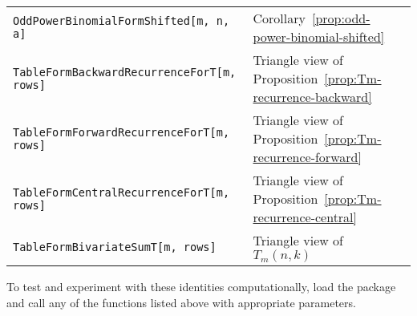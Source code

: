 \begin{center}
\begin{tabular}{ll}
        \texttt{OddPowerBinomialFormShifted[m, n, a]}       & Corollary~\ref{prop:odd-power-binomial-shifted}                    \\
        \texttt{TableFormBackwardRecurrenceForT[m, rows]}   & Triangle view of Proposition~\ref{prop:Tm-recurrence-backward}     \\
        \texttt{TableFormForwardRecurrenceForT[m, rows]}    & Triangle view of Proposition~\ref{prop:Tm-recurrence-forward}      \\
        \texttt{TableFormCentralRecurrenceForT[m, rows]}    & Triangle view of Proposition~\ref{prop:Tm-recurrence-central}      \\
        \texttt{TableFormBivariateSumT[m, rows]}            & Triangle view of $T_m(n, k)$                                       \\
        \bottomrule
    \end{tabular}
\end{center}

To test and experiment with these identities computationally, load the package and call any of the
functions listed above with appropriate parameters.

